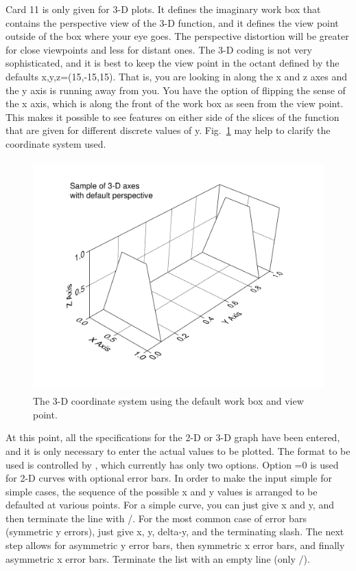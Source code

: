 Card 11 is only given for 3-D plots.  It defines the imaginary work
box that contains the perspective view of the 3-D function, and it
defines the view point outside of the box where your eye goes.  The
perspective distortion will be greater for close viewpoints and less
for distant ones.  The 3-D coding is not very sophisticated, and it
is best to keep the view point in the octant defined by the defaults
x,y,z=(15,-15,15).  That is, you are looking in along the x and z
axes and the y axis is running away from you.  You have the option
of flipping the sense of the x axis, which is along the front of
the work box as seen from the view point.  This makes it possible
to see features on either side of the slices of the function that
are given for different discrete values of y.  Fig.~\ref{axes} may
help to clarify the coordinate system used.

\begin{figure}[thb]\centering
\includegraphics[keepaspectratio, height=3.5in, angle=0]{figs/viewr1ack}
\caption[Sample 3-D plot with default axis and perspective]{The 3-D
 coordinate system using the default work box and view point.}
\label{axes}
\end{figure}

At this point, all the specifications for the 2-D or 3-D graph have
been entered, and it is only necessary to enter the actual values to
be plotted.  The format to be used is controlled by ,
which currently has only two options.  Option =0 is
used for 2-D curves with optional error bars.  In order to make
the input simple for simple cases, the sequence of the possible
x and y values is arranged to be defaulted at various points.  For
a simple curve, you can just give x and y, and then terminate the
line with /.  For the most common case of error bars (symmetric y
errors), just give x, y, delta-y, and the terminating slash.  The next
step allows for asymmetric y error bars, then symmetric x error bars,
and finally asymmetric x error bars.  Terminate the list with an empty
line (only /).

